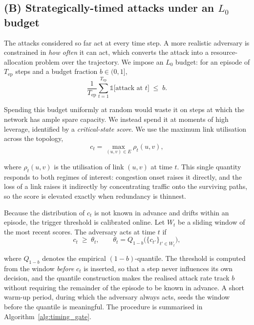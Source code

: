 \subsection{(B) Strategically-timed attacks under an \texorpdfstring{$L_0$}{L0} budget}
\label{subsec:timed_attack}

The attacks considered so far act at every time step. A more realistic adversary is
constrained in \emph{how often} it can act, which converts the attack into a
resource-allocation problem over the trajectory. We impose an $L_0$ budget: for an
episode of $T_{\text{ep}}$ steps and a budget fraction $b \in (0,1]$,
\begin{equation}
  \frac{1}{T_{\text{ep}}} \sum_{t=1}^{T_{\text{ep}}} \mathbb{1}\big[\text{attack at } t\big]
  \;\le\; b .
  \label{eq:l0_budget}
\end{equation}

Spending this budget uniformly at random would waste it on steps at which the
network has ample spare capacity. We instead spend it at moments of high leverage,
identified by a \emph{critical-state score}. We use the maximum link utilisation
across the topology,
\begin{equation}
  c_t = \max_{(u,v) \in E} \rho_t(u,v),
  \label{eq:critical_score}
\end{equation}

\noindent where $\rho_t(u,v)$ is the utilisation of link $(u,v)$ at time $t$. This
single quantity responds to both regimes of interest: congestion onset raises it
directly, and the loss of a link raises it indirectly by concentrating traffic onto
the surviving paths, so the score is elevated exactly when redundancy is thinnest.

Because the distribution of $c_t$ is not known in advance and drifts within an
episode, the trigger threshold is calibrated online. Let $W_t$ be a sliding window
of the most recent scores. The adversary acts at time $t$ if
\begin{equation}
  c_t \;\ge\; \theta_t,
  \qquad
  \theta_t = Q_{1-b}\big( \{ c_{t'} \}_{t' \in W_t} \big),
  \label{eq:timing_threshold}
\end{equation}

\noindent where $Q_{1-b}$ denotes the empirical $(1-b)$-quantile. The threshold is
computed from the window \emph{before} $c_t$ is inserted, so that a step never
influences its own decision, and the quantile construction makes the realised
attack rate track $b$ without requiring the remainder of the episode to be known in
advance. A short warm-up period, during which the adversary always acts, seeds the
window before the quantile is meaningful. The procedure is summarised in
Algorithm~\ref{alg:timing_gate}.

